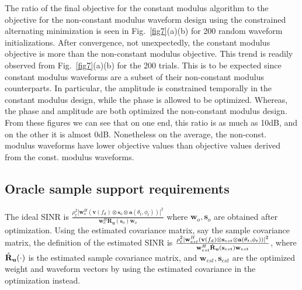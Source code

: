 \documentclass[11pt,draftclsnofoot,onecolumn]{IEEEtran}
\theoremstyle{definition}
\theoremstyle{remark}
\begin{document}
The ratio of the final objective for the constant modulus algorithm to the objective for the non-constant modulus waveform design using the constrained alternating minimization is seen in Fig.~\ref{fig7}(a)(b) for 200 random waveform initializations. After convergence, not unexpectedly, the constant modulus objective is more than the non-constant modulus objective. This trend is readily observed from Fig.~\ref{fig7}(a)(b) for the 200 trials. This is to be expected since constant modulus waveforms are a subset of their non-constant modulus counterparts. In particular, the amplitude is constrained temporally in the constant modulus design, while the phase is allowed to be optimized. Whereas, the phase and amplitude are both optimized the non-constant modulus design. From these figures we can see that on one end, this ratio is as much as 10dB, and on the other it is almost 0dB. Nonetheless on the average, the non-const. modulus waveforms have lower objective values than objective values derived from the const. modulus waveforms. 
\subsection{Oracle sample support requirements}
The ideal SINR is $\tfrac{\rho_t^2|\mathbf{w}^H_{o}(\mathbf{v}(f_d)\otimes\mathbf{s}_{o}\otimes\mathbf{a}(\theta_t,\phi_t))|^2}{\mathbf{w}^H_{o}\mathbf{R_u}(\mathbf{s}_{o})\mathbf{w}_{o}}$ where $\mathbf{w}_o,\mathbf{s}_o$ are obtained after optimization. Using the estimated covariance matrix, say the sample covariance matrix, the definition of the estimated SINR is $\tfrac{\rho_t^2|\mathbf{w}^H_{est}(\mathbf{v}(f_d)\otimes\mathbf{s}_{est}\otimes\mathbf{a}(\theta_t,\phi_t))|^2}{\mathbf{w}^H_{est}\hat{\mathbf{R}}_{\bf u}(\mathbf{s}_{est})\mathbf{w}_{est}}$, where $\hat{\mathbf{R}}_{\bf u}(\cdot)$ is the estimated sample covariance matrix, and $\mathbf{w}_{est},\mathbf{s}_{est}$ are the optimized weight and waveform vectors by using the estimated covariance in the optimization instead.
\end{document}
